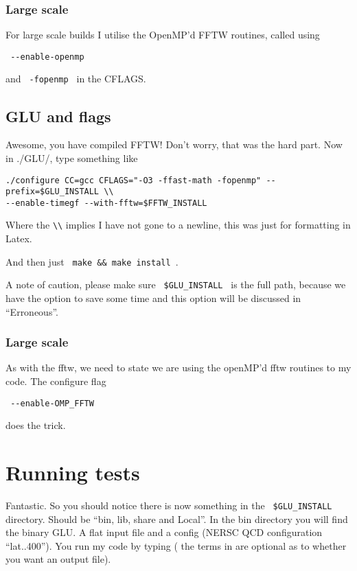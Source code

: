 \documentclass[12pt]{article}
\begin{document}
\subsubsection{Large scale}

For large scale builds I utilise the OpenMP'd FFTW routines, called using

\begin{verbatim}
 --enable-openmp
\end{verbatim}

and \verb| -fopenmp | in the CFLAGS. 

\subsection{GLU and flags}

Awesome, you have compiled FFTW! Don't worry, that was the hard part. Now in ./GLU/, type something like

\small{
\begin{verbatim}
./configure CC=gcc CFLAGS="-O3 -ffast-math -fopenmp" --prefix=$GLU_INSTALL \\
--enable-timegf --with-fftw=$FFTW_INSTALL
\end{verbatim}
}

Where the \verb|\\| implies I have not gone to a newline, this was just for formatting in Latex.

And then just \verb| make && make install |.

A note of caution, please make sure \verb| $GLU_INSTALL | is the full path, because we have the option to save some
time and this option will be discussed in ``Erroneous''.

\subsubsection{Large scale}
 
As with the fftw, we need to state we are using the openMP'd fftw routines to my code. The configure flag
\begin{verbatim}
 --enable-OMP_FFTW
\end{verbatim}
does the trick.

\section{Running tests}

Fantastic. So you should notice there is now something in the \verb| $GLU_INSTALL  | directory. Should be ``bin, lib,
share and Local''. In the bin directory you will find the binary
GLU. A flat input file and a config (NERSC QCD
configuration ``lat..400''). You run my code by typing ( the terms in {} are optional as to whether you want an output
file).
\end{document}
